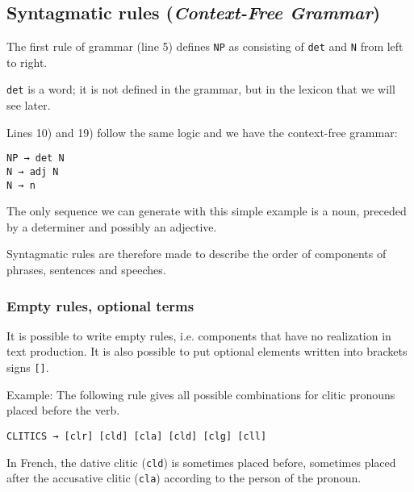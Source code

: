\documentclass[11pt]{article}
\begin{document}
\subsection{Syntagmatic rules (\textit{Context-Free Grammar})}
 
The first rule of grammar (line 5) defines \texttt{NP} as
consisting of \texttt{det} and \texttt{N} from left to right.

\texttt{det} is a word; it is not defined in the grammar, but
in the lexicon that we will see later.

Lines 10) and 19) follow the same logic and we have the
context-free grammar:

\begin{lstlisting}[numbers=none]
NP → det N
N → adj N
N → n
\end{lstlisting}

The only sequence we can generate with this simple example is
a noun, preceded by a determiner and possibly an adjective.

Syntagmatic rules are therefore made to describe the order of
components of phrases, sentences and speeches.

\subsubsection*{Empty rules, optional terms}
 
It is possible to write empty rules, i.e.  components that have no
realization in text production. It is also possible to put optional
elements written into brackets signs \verb#[]#.

Example: The following rule gives all possible combinations for clitic
pronouns placed before the verb.

\begin{lstlisting}[numbers=none]
  CLITICS → [clr] [cld] [cla] [cld] [clg] [cll] 
\end{lstlisting}

In French, the dative clitic (\texttt{cld}) is sometimes placed
before, sometimes placed after the accusative clitic (\texttt{cla})
according to the person of the pronoun.
\end{document}
